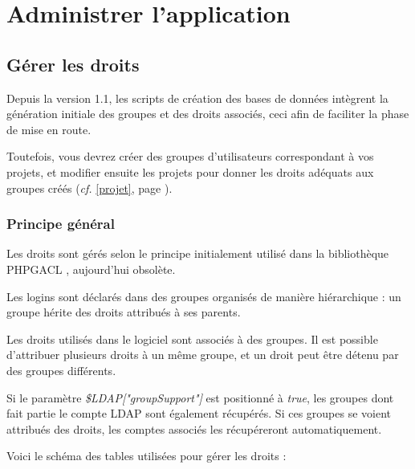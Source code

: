 \chapter{Administrer l'application}

\section{Gérer les droits}
\label{droits}

Depuis la version 1.1, les scripts de création des bases de données intègrent la génération initiale des groupes et des droits associés, ceci afin de faciliter la phase de mise en route.

Toutefois, vous devrez créer des groupes d'utilisateurs correspondant à vos projets, et modifier ensuite les projets pour donner les droits adéquats aux groupes créés (\textit{cf.} \ref{projet}, page \pageref{projet}).

\subsection{Principe général}

Les droits sont gérés selon le principe initialement utilisé dans la bibliothèque PHPGACL \cite{phpgacl}, aujourd'hui obsolète. 

Les logins sont déclarés dans des groupes organisés de manière hiérarchique : un groupe hérite des droits attribués à ses parents.

Les droits utilisés dans le logiciel sont associés à des groupes. Il est possible d'attribuer plusieurs droits à un même groupe, et un droit peut être détenu par des groupes différents.

Si le paramètre \textit{\$LDAP["groupSupport"]} est positionné à \textit{true}, les groupes dont fait partie le compte LDAP sont également récupérés. Si ces groupes se voient attribués des droits, les comptes associés les récupéreront automatiquement.

Voici le schéma des tables utilisées pour gérer les droits :

